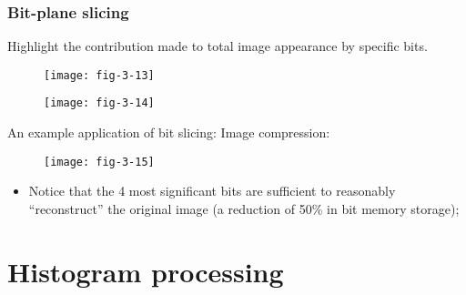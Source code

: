 \subsubsection{Bit-plane slicing}




\begin{frame}
Highlight the contribution made to total image appearance by specific bits.
\begin{figure}
\centering
\texttt{[image: fig-3-13]}
\end{figure}
\end{frame}


\begin{frame}
\begin{figure}
\centering
\texttt{[image: fig-3-14]}
\end{figure}
\end{frame}


\begin{frame}
An example application of bit slicing: Image compression:
\begin{figure}
\centering
\texttt{[image: fig-3-15]}
\end{figure}
\begin{itemize}
\item Notice that the 4 most significant bits are sufficient to reasonably ``reconstruct'' the original image (a reduction of 50\% in bit memory storage);
\end{itemize}
\end{frame}


\section{Histogram processing}

